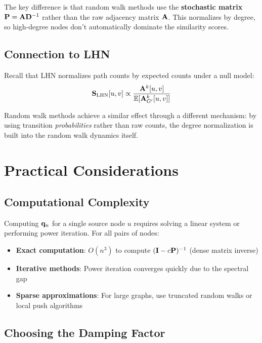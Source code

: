 \begin{notechapter}
\begin{keyidea}
The key difference is that random walk methods use the \textbf{stochastic matrix} $\mathbf{P} = \mathbf{A}\mathbf{D}^{-1}$ rather than the raw adjacency matrix $\mathbf{A}$. This normalizes by degree, so high-degree nodes don't automatically dominate the similarity scores.
\end{keyidea}

\subsection{Connection to LHN}

Recall that LHN normalizes path counts by expected counts under a null model:
\[
\mathbf{S}_{\text{LHN}}[u,v] \propto \frac{\mathbf{A}^k[u,v]}{\mathbb{E}[\mathbf{A}_{G'}^k[u,v]]}
\]

Random walk methods achieve a similar effect through a different mechanism: by using transition \emph{probabilities} rather than raw counts, the degree normalization is built into the random walk dynamics itself.

\section{Practical Considerations}

\subsection{Computational Complexity}

Computing $\mathbf{q}_u$ for a single source node $u$ requires solving a linear system or performing power iteration. For all pairs of nodes:
\begin{itemize}
    \item \textbf{Exact computation}: $O(n^3)$ to compute $(\mathbf{I} - c\mathbf{P})^{-1}$ (dense matrix inverse)
    \item \textbf{Iterative methods}: Power iteration converges quickly due to the spectral gap
    \item \textbf{Sparse approximations}: For large graphs, use truncated random walks or local push algorithms
\end{itemize}

\subsection{Choosing the Damping Factor}


\end{notechapter}
